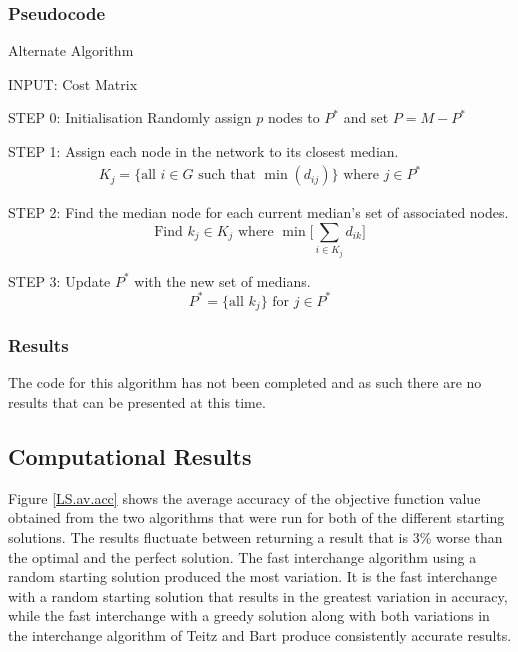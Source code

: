 \documentclass[11pt]{article}
\begin{document}
	\subsubsection{Pseudocode}
	\begin{algorithm}
		\caption{Alternate Algorithm}
		\begin{algorithmic}[0]
			\Statex 
			\Statex INPUT: Cost Matrix
			
			\Statex 
			\Statex STEP 0: Initialisation
			\Statex Randomly assign $p$ nodes to $P^*$ and set $P = M - P^*$
			
			\Statex 
			\Statex STEP 1: Assign each node in the network to its closest median.
			\begin{align*}
			K_j=\{\text{all } i \in G \text{ such that } \min (d_{ij})\} \text{ where } j \in P^*
			\end{align*}
			
			\Statex 
			\Statex STEP 2: Find the median node for each current median's set of associated nodes.
			\begin{equation*}
			\text{Find } k_j \in K_j \text{ where } \min \bigg[ \sum_{i\in K_j} d_{ik} \bigg] 
			\end{equation*}
			
			
			\Statex 
			\Statex STEP 3: Update $P^*$ with the new set of medians.
			\begin{equation*}
			P^{*} = \{\text{all } k_j  \} \text{ for } j \in P^*
			\end{equation*}
			
			
		\end{algorithmic}
	\end{algorithm}

	\subsubsection{Results}
	The code for this algorithm has not been completed and as such there are no results that can be presented at this time.
	
	\subsection{Computational Results} \label{classicheuristics.localsearch.results}
	Figure \ref{LS.av.acc} shows the average accuracy of the objective function value obtained from the two algorithms that were run for both of the different starting solutions.  The results fluctuate between returning a result that is 3\% worse than the optimal and the perfect solution.  The fast interchange algorithm using a random starting solution produced the most variation.  It is the fast interchange with a random starting solution that results in the greatest variation in accuracy, while the fast interchange with a greedy solution along with both variations in the interchange algorithm of Teitz and Bart produce consistently accurate results.
	
\end{document}
